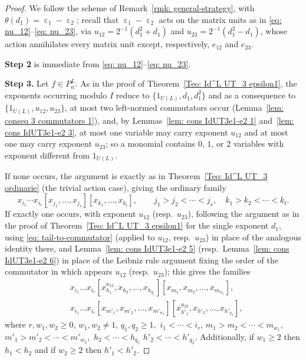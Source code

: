 \documentclass[10pt,a4paper]{amsart}
\DeclareMathOperator{\e}{\varepsilon}
\begin{document}
\begin{proof}
We follow the scheme of Remark~\ref{rmk: general-strategy}, with $\theta(d_1)=\e_1-\e_2$; recall
that $\e_1-\e_2$ acts on the matrix units as in \eqref{eq: nu_12}--\eqref{eq: nu_23}, via
$u_{12}=2^{-1}(d_1^2+d_1)$ and $u_{23}=2^{-1}(d_1^2-d_1)$, whose action annihilates every matrix
unit except, respectively, $e_{12}$ and $e_{23}$.

\textbf{Step 2} is immediate from \eqref{eq: nu_12}--\eqref{eq: nu_23}.

\textbf{Step 3.} Let $f\in P_n^L$. As in the proof of Theorem~\ref{Teo: Id^L UT_3 epsilon1}, the exponents occurring
modulo $I$ reduce to $\{1_{U(L)}, d_1, d_1^2\}$ and as a consequence to $\{1_{U(L)},u_{12},u_{23}\}$, at most two left-normed commutators occur
(Lemma~\ref{lem: conseq 3 commutators 1}), and, by Lemmas~\ref{lem: cons IdUT3e1-e2 1}
and~\ref{lem: cons IdUT3e1-e2 3}, at most one variable may carry exponent $u_{12}$ and at most one
may carry exponent $u_{23}$; so a monomial contains $0$, $1$, or $2$ variables with exponent
different from $1_{U(L)}$.

If none occurs, the argument is exactly as in Theorem~\ref{Teo: Id^L UT_3 ordinarie} (the trivial
action case), giving the ordinary family
$$
x_{i_1}\cdots x_{i_r}[x_{j_1},\ldots,x_{j_s}][x_{k_1},\ldots,x_{k_t}], \qquad
j_1>j_2<\cdots<j_s, \quad k_1>k_2<\cdots<k_t.
$$
If exactly one occurs, with exponent $u_{12}$ (resp.\
$u_{23}$), following the argument as in the proof of Theorem~\ref{Teo: Id^L UT_3 epsilon1} for the
single exponent $d_1$, using \eqref{eq: tail-to-commutator} (applied to $u_{12}$, resp.\ $u_{23}$) in
place of the analogous identity there, and Lemma~\ref{lem: cons IdUT3e1-e2 5} (resp.\
Lemma~\ref{lem: cons IdUT3e1-e2 6})  in place of the Leibniz rule argument fixing the order of the commutator in which appears $u_{12}$ (resp.\ $u_{23}$); this gives the families 
\begin{align*}
&x_{i_{1}}\dots x_{i_{r}}[x_{h_1}^{u_{12}},x_{h_2},\dots,x_{h_{q_1}}][x_{m_1},x_{m_2},\dots,x_{m_{w_1}}],\\ 
&x_{i_{1}}\dots x_{i_{r}}[x_{m'_1},x_{m'_2},\dots,x_{m'_{w_2}}][x_{h'_1}^{u_{23}},x_{h'_2},\dots,x_{h'_{q_2}}],
\end{align*}
where $r,w_1,w_2\geq 0$,  $w_1,w_2\neq 1$, $ q_1,q_2\geq 1,$  $i_1<\cdots < i_r$, $m_1>m_2< \cdots < m_{w_1},$  $m'_1>m'_2< \cdots < m'_{w_2},$  $h_2< \cdots <h_{q_1}$  $h'_2< \cdots <h'_{q_2}.$ Additionally,  if $w_1\geq 2$  then $h_1<h_2$   and if $w_2\geq 2$  then $h'_1<h'_2.$
    


\end{proof}
\end{document}
